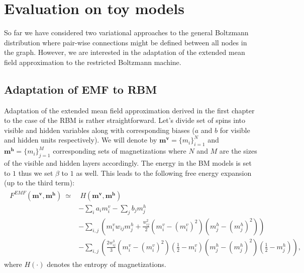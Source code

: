 
\chapter{Evaluation on toy models}
So far we have considered two variational approaches to the general Boltzmann distribution where pair-wise connections might be defined between all nodes in the graph. However, we are interested in the adaptation of the extended mean field approximation to the restricted Boltzmann machine.

\section{Adaptation of EMF to RBM}
Adaptation of the extended mean field approximation derived in the first chapter to the case of the RBM is rather straightforward. Let's divide set of spins into visible  and hidden variables along with corresponding biases ($a$ and $b$ for visible and hidden units respectively). We will denote by $\mathbf{m}^\mathbf{v} = \{m_i \}_{i=1}^N$ and $\mathbf{m}^\mathbf{h} = \{m_i \}_{j=1}^M$ corresponding sets of magnetizations where $N$ and $M$ are the sizes of the visible and hidden layers accordingly. The energy in the BM models is set to $1$ thus we set $\beta$ to $1$ as well. This leads to the following free energy expansion (up to the third term):
\begin{align}
\begin{split}
F^{EMF}(\mathbf{m^v},\mathbf{m^h}) ~\simeq & ~H(\mathbf{m^v}, \mathbf{m^h}) \\
&  - \sum_i a_i m_i^v - \sum_j b_j m_j^h \\
 & - \sum_{i,j} \left( 
 m_i^v w_{ij} m_j^h +  \frac{w_{ij}^2}{2}(m_i^v - (m_i^v)^2)(m_j^h - (m_j^h)^2) 
  \right) \\
    &  - \sum_{i,j} \left( 
 \frac{2w_{ij}^3}{3}(m_i^v - (m_i^v)^2)(\frac{1}{2} - m_i^v)(m_j^h - (m_j^h)^2)(\frac{1}{2} - m_j^h)  \right), 
\label{eq:expansionRBM}
\end{split}
\end{align}
where $H(\cdot)$ denotes the entropy of magnetizations.
